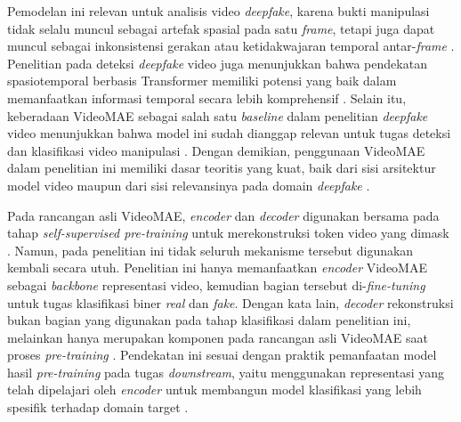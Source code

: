 Pemodelan ini relevan untuk analisis video \textit{deepfake}, karena bukti manipulasi tidak selalu muncul sebagai artefak spasial pada satu \textit{frame}, tetapi juga dapat muncul sebagai inkonsistensi gerakan atau ketidakwajaran temporal antar-\textit{frame} \cite{Gu2021,KINGRA2024301817}. Penelitian pada deteksi \textit{deepfake} video juga menunjukkan bahwa pendekatan spasiotemporal berbasis Transformer memiliki potensi yang baik dalam memanfaatkan informasi temporal secara lebih komprehensif \cite{KINGRA2024301817}. Selain itu, keberadaan VideoMAE sebagai salah satu \textit{baseline} dalam penelitian \textit{deepfake} video menunjukkan bahwa model ini sudah dianggap relevan untuk tugas deteksi dan klasifikasi video manipulasi \cite{hu2024delocatedetectionlocalizationdeepfake}. Dengan demikian, penggunaan VideoMAE dalam penelitian ini memiliki dasar teoritis yang kuat, baik dari sisi arsitektur model video maupun dari sisi relevansinya pada domain \textit{deepfake} \cite{tong2022videomaemaskedautoencodersdataefficient,hu2024delocatedetectionlocalizationdeepfake,das2024unmaskingdeepfakesmaskedautoencoding}. \par

Pada rancangan asli VideoMAE, \textit{encoder} dan \textit{decoder} digunakan bersama pada tahap \textit{self-supervised pre-training} untuk merekonstruksi token video yang dimask \cite{tong2022videomaemaskedautoencodersdataefficient}. Namun, pada penelitian ini tidak seluruh mekanisme tersebut digunakan kembali secara utuh. Penelitian ini hanya memanfaatkan \textit{encoder} VideoMAE sebagai \textit{backbone} representasi video, kemudian bagian tersebut di-\textit{fine-tuning} untuk tugas klasifikasi biner \textit{real} dan \textit{fake}. Dengan kata lain, \textit{decoder} rekonstruksi bukan bagian yang digunakan pada tahap klasifikasi dalam penelitian ini, melainkan hanya merupakan komponen pada rancangan asli VideoMAE saat proses \textit{pre-training} \cite{tong2022videomaemaskedautoencodersdataefficient}. Pendekatan ini sesuai dengan praktik pemanfaatan model hasil \textit{pre-training} pada tugas \textit{downstream}, yaitu menggunakan representasi yang telah dipelajari oleh \textit{encoder} untuk membangun model klasifikasi yang lebih spesifik terhadap domain target \cite{tong2022videomaemaskedautoencodersdataefficient,hu2024delocatedetectionlocalizationdeepfake}. \par

